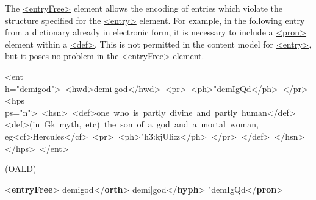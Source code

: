 The \hyperref[TEI.entryFree]{<entryFree>} element allows the encoding of entries which violate the structure specified for the \hyperref[TEI.entry]{<entry>} element. For example, in the following entry from a dictionary already in electronic form, it is necessary to include a \hyperref[TEI.pron]{<pron>} element within a \hyperref[TEI.def]{<def>}. This is not permitted in the content model for \hyperref[TEI.entry]{<entry>}, but it poses no problem in the \hyperref[TEI.entryFree]{<entryFree>} element. \par\bgroup\exampleFont \begin{shaded}\noindent\mbox{}<ent\newline
h="demigod"> <hwd>demi|god</hwd> <pr> <ph>"demIgQd</ph> </pr> <hps\newline
ps="n"> <hsn> <def>one who is partly divine and partly human</def>\newline
<def>(in Gk myth, etc) the son of a god and a mortal woman,\newline
eg<cf>Hercules</cf> <pr> <ph>"h3:kjUli:z</ph> </pr> </def> </hsn>\newline
</hps> </ent> \end{shaded}\egroup\par \noindent (\hyperref[DIC-OALD]{OALD}) \par\bgroup{}\exampleFont \begin{shaded}\noindent\mbox{}{<\textbf{entryFree}>}\mbox{}\newline 
{}\mbox{}\newline 
\hspace*{1em}demigod{</\textbf{orth}>}\mbox{}\newline 
\hspace*{1em}demi|god{</\textbf{hyph}>}\mbox{}\newline 
\hspace*{1em}"demIgQd{</\textbf{pron}>}\mbox{}\newline 

\end{shaded}
